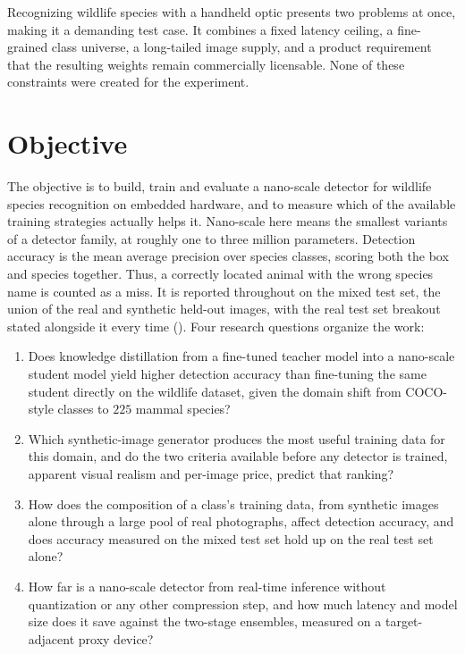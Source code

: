 Recognizing wildlife species with a handheld optic presents two problems at once, making it a demanding test case. It combines a fixed latency ceiling, a fine-grained class universe, a long-tailed image supply, and a product requirement that the resulting weights remain commercially licensable. None of these constraints were created for the experiment.

\section{Objective}\label{sec:objective}

The objective is to build, train and evaluate a nano-scale detector for wildlife species recognition on embedded hardware, and to measure which of the available training strategies actually helps it. Nano-scale here means the smallest variants of a detector family, at roughly one to three million parameters. Detection accuracy is the mean average precision over species classes, scoring both the box and species together. Thus, a correctly located animal with the wrong species name is counted as a miss. It is reported throughout on the mixed test set, the union of the real and synthetic held-out images, with the real test set breakout stated alongside it every time (). Four research questions organize the work:

\begin{enumerate}
    \item Does knowledge distillation from a fine-tuned teacher model into a nano-scale student model yield higher detection accuracy than fine-tuning the same student directly on the wildlife dataset, given the domain shift from COCO-style classes to $225$ mammal species?
    \item Which synthetic-image generator produces the most useful training data for this domain, and do the two criteria available before any detector is trained, apparent visual realism and per-image price, predict that ranking?
    \item How does the composition of a class's training data, from synthetic images alone through a large pool of real photographs, affect detection accuracy, and does accuracy measured on the mixed test set hold up on the real test set alone?
    \item How far is a nano-scale detector from real-time inference without quantization or any other compression step, and how much latency and model size does it save against the two-stage ensembles, measured on a target-adjacent proxy device?
\end{enumerate}

